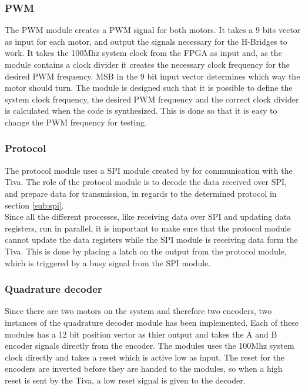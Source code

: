 \documentclass[../../../main]{subfiles}
\begin{document}
\subsubsection{PWM}
The PWM module creates a PWM signal for both motors. It takes a 9 bits vector as input for each motor, and output the signals necessary for the H-Bridges to work.
It  takes the 100Mhz system clock from the FPGA as input and, as the module contains a clock divider it creates the necessary clock frequency for the desired PWM frequency.
MSB in the 9 bit input vector determines which way the motor should turn.
The module is designed such that it is possible to define the system clock frequency, the desired PWM frequency and the correct clock divider is calculated when the code is synthesized.
This is done so that it is easy to change the PWM frequency for testing.
\subsubsection{Protocol}
The protocol module uses a SPI module created by  for communication with the Tiva.
The role of the protocol module is to decode the data received over SPI, and prepare data for transmission, in regards to the determined protocol in section \ref{sub:spi}.
\\
Since all the different processes, like receiving data over SPI and updating data registers, run in parallel, it is important to make sure that the protocol module cannot update the data registers while the SPI module is receiving data form the Tiva.
This is done by placing a latch on the output from the protocol module, which is triggered by a busy signal from the SPI module.

\subsubsection{Quadrature decoder}
\label{subsubsec:Qdecoder_implement}
Since there are two motors on the system and therefore two encoders, two instances of the quadrature decoder module has been implemented.
Each of these modules has a 12 bit position vector as thier output and takes the A and B encoder signals directly from the encoder. The modules uses the 100Mhz system clock directly and takes a reset which is active low as input.
The reset for the encoders are inverted before they are handed to the modules, so when a high reset is sent by the Tiva, a low reset signal is given to the decoder.
\end{document}
